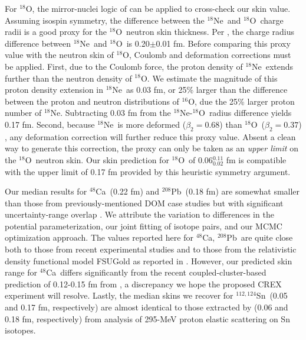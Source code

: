 \documentclass[twocolumn,secnumarabic,amssymb, nobibnotes, aps, prl, superscriptaddress, nobalancelastpage]{revtex4-1}
\newcommand{\oSix}{\ensuremath{^{16}}O}
\newcommand{\oEight}{\ensuremath{^{18}}O}
\newcommand{\neEight}{\ensuremath{^{18}}N\lowercase{e}}
\newcommand{\caEight}{\ensuremath{^{48}}C\lowercase{a}}
\newcommand{\snTwelveFour}{\ensuremath{^{112,124}}S\lowercase{n}}
\newcommand{\pbEight}{\ensuremath{^{208}}P\lowercase{b}}
\begin{document}
For \oEight, the mirror-nuclei logic of \cite{Brown2017} can be applied to cross-check
our skin value. Assuming isospin symmetry, the difference between
the \neEight\ and \oEight\ charge radii is a good proxy for the \oEight\ neutron skin thickness. Per \cite{Angeli2013},
the charge radius difference between \neEight\ and \oEight\ is 0.20$\pm$0.01 fm. Before comparing this
proxy value with the neutron skin of \oEight, Coulomb and deformation corrections must be applied.
First, due to the Coulomb force, the proton density of \neEight\ extends further than the neutron
density of \oEight. We estimate the magnitude of this proton density extension in \neEight\ as 0.03
fm, or 25\% larger than the difference between the proton and neutron distributions of \oSix,
due the 25\% larger proton number of \neEight. Subtracting 0.03 fm from the \neEight-\oEight\
radius difference yields 0.17 fm. Second, because \neEight\ is more deformed
($\beta_{2}=0.68$) than \oEight\ ($\beta_{2}=0.37$) \cite{NUDATDatabase}, any deformation correction
will further reduce this proxy value. Absent a clean way to generate this correction, the proxy can only be taken
as an \textit{upper limit} on the \oEight\ neutron skin. Our skin prediction for \oEight\ of
0.06$^{0.11}_{0.02}$ fm is compatible with the upper limit of 0.17 fm provided by this
heuristic symmetry argument.

Our median results for \caEight\ (0.22 fm) and \pbEight\
(0.18 fm) are somewhat smaller than those from previously-mentioned
DOM case studies but with significant uncertainty-range overlap \cite{Mahzoon2017, Atkinson2020}.
We attribute the variation to differences in the potential parameterization, our joint fitting of
isotope pairs, and our MCMC optimization approach. The values reported here for \caEight, \pbEight\ are
quite close both to those from recent experimental studies
\cite{Zenihiro2018, Tarbert2014, Zenihiro2010} and to those from the relativistic density functional model
FSUGold as reported in \cite{Thiel2019}. However, our predicted skin range for
\caEight\ differs significantly from the recent coupled-cluster-based prediction of 0.12-0.15 fm from \cite{Hagen2016},
a discrepancy we hope the proposed CREX experiment will resolve. Lastly, the median skins we recover
for \snTwelveFour\ (0.05 and 0.17 fm, respectively) are almost identical to those extracted by
\cite{Terashima2008} (0.06 and 0.18 fm, respectively) from analysis of
295-MeV proton elastic scattering on Sn isotopes. 
\end{document}
